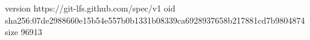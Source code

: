 version https://git-lfs.github.com/spec/v1
oid sha256:07de2988660e15b54e557b0b1331b08339ca6928937658b217881cd7b9804874
size 96913
